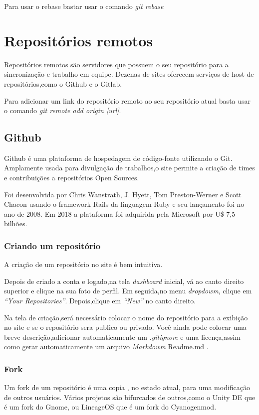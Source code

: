 \documentclass[]{article}
\begin{document}
Para usar o rebase bastar usar o comando \textit{git rebase}


\section{Repositórios remotos}

Repositórios remotos são servidores que possuem o seu repositório para a sincronização e trabalho em equipe.
 Dezenas de sites oferecem serviços de host de repositórios,como o Github e o Gitlab.
 
 Para adicionar um link do repositório remoto ao seu repositório atual basta usar o comando \textit{git remote add origin [url]}.
 \subsection*{Github}
Github é uma plataforma de hospedagem de código-fonte utilizando o Git.
Amplamente usada para divulgação de trabalhos,o site permite a criação de times e contribuições a repositórios Open Sources.

Foi desenvolvida por Chris Wanstrath, J. Hyett, Tom Preston-Werner e Scott Chacon usando o framework Rails da linguagem Ruby e seu lançamento foi no ano de 2008.
Em 2018 a plataforma foi adquirida pela Microsoft por U\$ 7,5 bilhões.
\subsubsection*{Criando um repositório}
A criação de um repositório no site é bem intuitiva.

Depois de criado a conta e logado,na tela \textit{dashboard} inicial, vá ao canto direito superior e clique na sua foto de perfil.
Em seguida,no menu \textit{dropdowm}, clique em \textit{``Your Repositories''}.
Depois,clique em \textit{``New''} no canto direito.

Na tela de criação,será necessário colocar o nome do repositório para a exibição no site e se o repositório sera publico ou privado.
Você ainda pode colocar uma breve descrição,adicionar automaticamente um \textit{.gitignore} e uma licença,assim como gerar automaticamente um arquivo \textit{Markdowm} Readme.md .

\subsubsection*{Fork}

Um fork de um repositório é uma copia , no estado atual, para uma modificação de outros usuários.
Vários projetos são bifurcados de outros,como o Unity DE que é um fork do Gnome, ou LineageOS que é um fork do Cyanogenmod.
\end{document}
